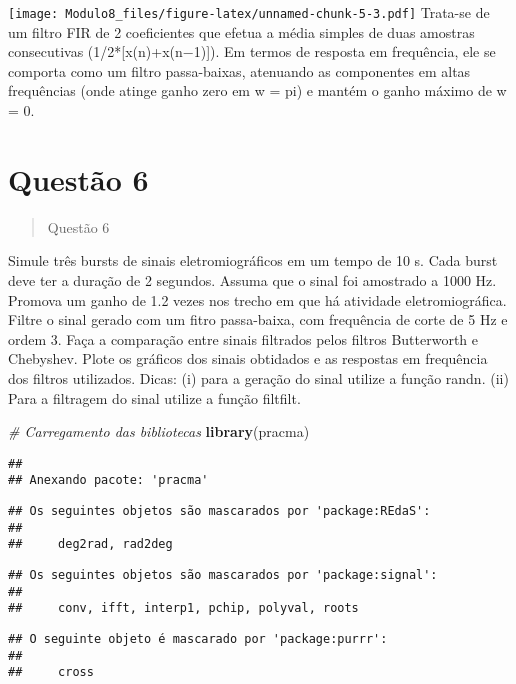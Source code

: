 \documentclass[
]{article}
\newenvironment{Shaded}{\begin{snugshade}}{\end{snugshade}}
\newcommand{\CommentTok}[1]{\textcolor[rgb]{0.56,0.35,0.01}{\textit{#1}}}
\newcommand{\FunctionTok}[1]{\textcolor[rgb]{0.13,0.29,0.53}{\textbf{#1}}}
\newcommand{\NormalTok}[1]{#1}
\begin{document}
\texttt{[image: Modulo8\_files/figure-latex/unnamed-chunk-5-3.pdf]}
Trata-se de um filtro FIR de 2 coeficientes que efetua a média simples
de duas amostras consecutivas (1/2*{[}x(n)+x(n−1){]}). Em termos de
resposta em frequência, ele se comporta como um filtro passa-baixas,
atenuando as componentes em altas frequências (onde atinge ganho zero em
w = pi) e mantém o ganho máximo de w = 0.

\newpage
\section*{Questão 6}

\begin{quote}
Questão 6
\end{quote}

Simule três bursts de sinais eletromiográficos em um tempo de 10 s. Cada
burst deve ter a duração de 2 segundos. Assuma que o sinal foi amostrado
a 1000 Hz. Promova um ganho de 1.2 vezes nos trecho em que há atividade
eletromiográfica. Filtre o sinal gerado com um fitro passa-baixa, com
frequência de corte de 5 Hz e ordem 3. Faça a comparação entre sinais
filtrados pelos filtros Butterworth e Chebyshev. Plote os gráficos dos
sinais obtidados e as respostas em frequência dos filtros utilizados.
Dicas: (i) para a geração do sinal utilize a função randn. (ii) Para a
filtragem do sinal utilize a função filtfilt.

\begin{Shaded}
\begin{Highlighting}[]
\CommentTok{\# Carregamento das bibliotecas}
\FunctionTok{library}\NormalTok{(pracma)}
\end{Highlighting}
\end{Shaded}

\begin{verbatim}
## 
## Anexando pacote: 'pracma'
\end{verbatim}

\begin{verbatim}
## Os seguintes objetos são mascarados por 'package:REdaS':
## 
##     deg2rad, rad2deg
\end{verbatim}

\begin{verbatim}
## Os seguintes objetos são mascarados por 'package:signal':
## 
##     conv, ifft, interp1, pchip, polyval, roots
\end{verbatim}

\begin{verbatim}
## O seguinte objeto é mascarado por 'package:purrr':
## 
##     cross
\end{verbatim}
\end{document}
